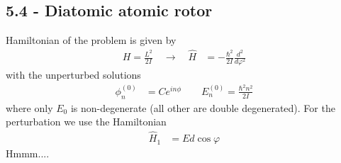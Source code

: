\documentclass[10pt,a4paper]{book}
\theoremstyle{definition}
\begin{document}
\subsection{5.4 - Diatomic atomic rotor}
Hamiltonian of the problem is given by
\begin{align}
H=\frac{L^2}{2I}\quad\rightarrow\quad\hat{H}&=-\frac{\hbar^2}{2I}\frac{d^2}{d\varphi^2}
\end{align}
with the unperturbed solutions
\begin{align}
\phi_n^{(0)}&=C e^{in\phi}\qquad E_n^{(0)}=\frac{\hbar^2n^2}{2I}
\end{align}
where only $E_0$  is non-degenerate (all other are double degenerated). 
For the perturbation we use the Hamiltonian
\begin{align}
\hat{H}_1&=Ed\cos\varphi
\end{align}
Hmmm....
\end{document}
